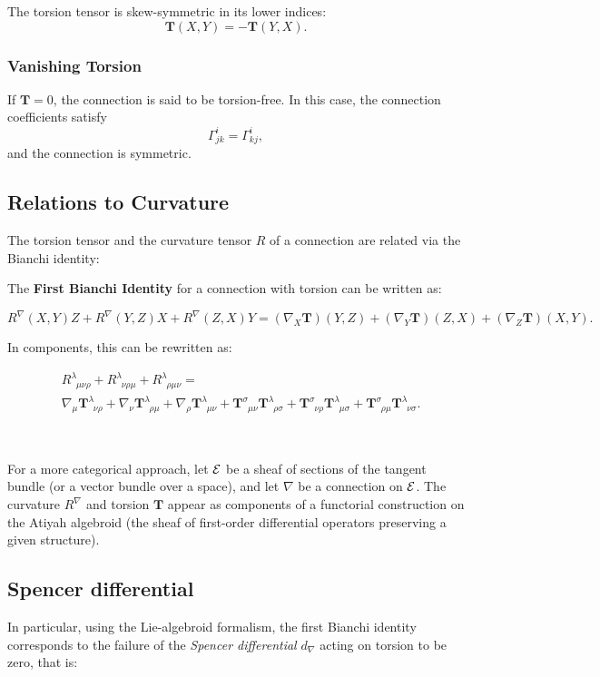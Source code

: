 The torsion tensor is skew-symmetric in its lower indices:
\[\boldsymbol{T}(X,Y)=-\boldsymbol{T}(Y,X).\]

\subsubsection{\bf Vanishing Torsion}

If $\boldsymbol{T}=0$, the connection is said to be torsion-free. In this case, the connection coefficients satisfy 
\[\Gamma_{jk}^i=\Gamma_{kj}^i,\] and the connection is symmetric. 
\subsection{Relations to Curvature}
The torsion tensor and the curvature tensor $R$ of a connection are related via the Bianchi identity: 

The \textbf{First Bianchi Identity} for a connection with torsion can be written as:

\begin{equation}
    R^\nabla(X, Y)Z + R^\nabla(Y, Z)X + R^\nabla(Z, X)Y = (\nabla_X \boldsymbol{T})(Y, Z) + (\nabla_Y \boldsymbol{T})(Z, X) + (\nabla_Z \boldsymbol{T})(X, Y).
\end{equation}

In components, this can be rewritten as: 

\begin{align*}
 &R^\lambda_{\;\;\mu\nu\rho} + R^\lambda_{\;\;\nu\rho\mu} + R^\lambda_{\;\;\rho\mu\nu} = \\
 & \nabla_\mu \boldsymbol{T}^\lambda_{\;\;\nu\rho} + \nabla_\nu \boldsymbol{T}^\lambda_{\;\;\rho\mu} + \nabla_\rho \boldsymbol{T}^\lambda_{\;\;\mu\nu} + \boldsymbol{T}^\sigma_{\;\;\mu\nu} \boldsymbol{T}^\lambda_{\;\;\rho\sigma} + \boldsymbol{T}^\sigma_{\;\;\nu\rho} \boldsymbol{T}^\lambda_{\;\;\mu\sigma} + \boldsymbol{T}^\sigma_{\;\;\rho\mu} \boldsymbol{T}^\lambda_{\;\;\nu\sigma}.
\end{align*}


\, 

For a more categorical approach, let $\mathcal{E}$ be a sheaf of sections of the tangent bundle (or a vector bundle over a space), and let 
$\nabla$ be a connection on $\mathcal{E}$. The curvature $R^{\nabla}$ and torsion $\boldsymbol{T}$
appear as components of a functorial construction on the Atiyah algebroid 
(the sheaf of first-order differential operators preserving a given structure).

\subsection{Spencer differential}
In particular, using the Lie-algebroid formalism, the first Bianchi identity corresponds to the failure of the \textit{Spencer differential} $d_\nabla$ acting on torsion to be zero, that is:

